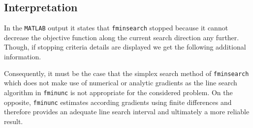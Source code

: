 \documentclass{article}
\begin{document}
	\subsection{Interpretation}
	In the \texttt{MATLAB} output it states that \texttt{fminsearch} stopped because it cannot decrease the objective function along the current search direction any further. Though, if stopping criteria details are displayed we get the following additional information.
	
	Consequently, it must be the case that the simplex search method of \texttt{fminsearch} which does not make use of numerical or analytic gradients as the line search algorithm in \texttt{fminunc} is not appropriate for the considered problem. On the opposite, \texttt{fminunc} estimates according gradients using finite differences and therefore provides an adequate line search interval and ultimately a more reliable result.
\end{document}
